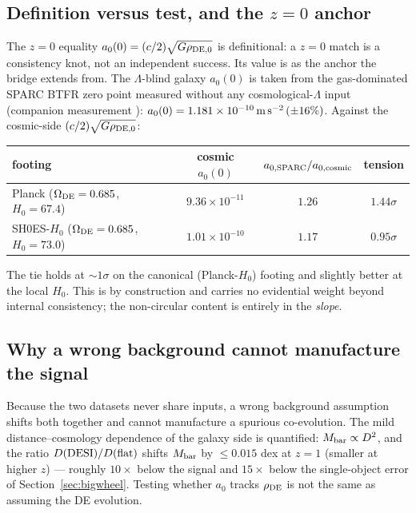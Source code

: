 \documentclass[11pt,a4paper]{article}
\newcommand{\Mbar}{M_{\rm bar}}
\newcommand{\rhoDE}{\rho_{\rm DE}}
\newcommand{\azero}{a_0}
\newcommand{\msms}{{\rm m\,s^{-2}}}
\begin{document}
\subsection{Definition versus test, and the $z=0$ anchor}
\label{sec:z0tie}

The $z=0$ equality $\azero(0)=(c/2)\sqrt{G\rho_{\rm DE,0}}$ is definitional: a
$z=0$ match is a consistency knot, not an independent success. Its value is as
the anchor the bridge extends from. The $\Lambda$-blind galaxy $\azero(0)$ is
taken from the gas-dominated SPARC BTFR zero point measured without any
cosmological-$\Lambda$ input (companion measurement \cite{Za0line}):
$\azero(0)=1.181\times10^{-10}\,\msms\,(\pm16\%)$. Against the cosmic-side
$(c/2)\sqrt{G\rho_{\rm DE,0}}$:

\begin{center}
\begin{tabular}{lccc}
\toprule
footing & cosmic $\azero(0)$ & $a_{0,{\rm SPARC}}/a_{0,{\rm cosmic}}$ & tension\\
\midrule
Planck ($\Omega_{\rm DE}=0.685$, $H_0=67.4$) & $9.36\times10^{-11}$ & $1.26$ & $1.44\sigma$\\
SH0ES-$H_0$ ($\Omega_{\rm DE}=0.685$, $H_0=73.0$) & $1.01\times10^{-10}$ & $1.17$ & $0.95\sigma$\\
\bottomrule
\end{tabular}
\end{center}

The tie holds at $\sim1\sigma$ on the canonical (Planck-$H_0$) footing and
slightly better at the local $H_0$. This is by construction and carries no
evidential weight beyond internal consistency; the non-circular content is
entirely in the \emph{slope}.

\subsection{Why a wrong background cannot manufacture the signal}

Because the two datasets never share inputs, a wrong background assumption
shifts both together and cannot manufacture a spurious co-evolution. The mild
distance--cosmology dependence of the galaxy side is quantified:
$\Mbar\propto D^2$, and the ratio $D({\rm DESI})/D({\rm flat})$ shifts $\Mbar$
by $\le0.015$ dex at $z=1$ (smaller at higher $z$) --- roughly $10\times$
below the signal and $15\times$ below the single-object error of
Section~\ref{sec:bigwheel}. Testing whether $\azero$ tracks $\rhoDE$ is not
the same as assuming the DE evolution.
\end{document}
